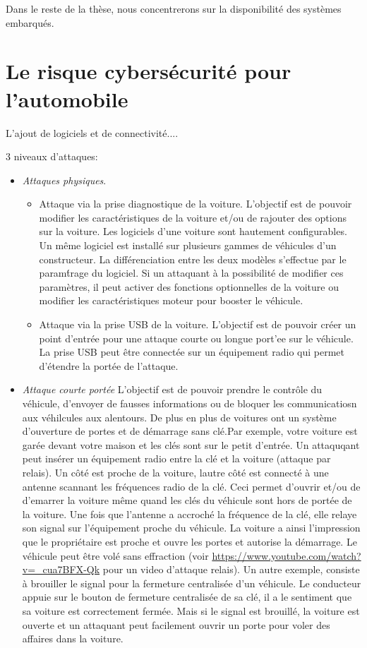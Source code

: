Dans le reste de la th\`ese, nous concentrerons sur la disponibilit\'e des syst\`emes embarqu\'es. 


\section {Le risque cybers\'ecurit\'e pour l'automobile}
 \medskip
 {\Huge L}'ajout de logiciels et de connectivit\'e....


3 niveaux d'attaques:
\begin{itemize}
\setlength\itemsep{1em}
\item \emph{Attaques physiques}. 
\begin{itemize}
\item Attaque via la prise diagnostique de la voiture. L'objectif est de pouvoir modifier les caract\'eristiques de la voiture et/ou de rajouter des options sur la voiture. Les logiciels d'une voiture sont hautement configurables. Un m\^eme logiciel est install\'e sur plusieurs gammes de v\'ehicules d'un constructeur. La diff\'erenciation entre les deux mod\`eles s'effectue par le param\'trage du logiciel. Si un attaquant \`a la possibilit\'e de modifier ces param\`etres, il peut activer des fonctions optionnelles de la voiture ou modifier les caract\'eristiques moteur pour booster le v\'ehicule.
\item Attaque via la prise USB de la voiture. L'objectif est de pouvoir cr\'eer un point d'entr\'ee pour une attaque courte ou longue port'ee sur le v\'ehicule. La prise USB peut \^etre connect\'ee sur un \'equipement radio qui permet d'\'etendre la port\'ee de l'attaque.
\end{itemize}

\item \emph{Attaque courte port\'ee} L'objectif est de pouvoir prendre le contr\^ole du v\'ehicule, d'envoyer de fausses informations ou de bloquer les communicatiosn aux v\'ehilcules aux alentours. De plus en plus de voitures ont un syst\`eme d'ouverture de portes et de d\'emarrage sans cl\'e.Par exemple, votre voiture est gar\'ee devant votre maison et les cl\'es sont sur le petit d'entr\'ee.  Un attaquqant peut ins\'erer un \'equipement radio entre la cl\'e et la voiture (attaque par relais). Un c\^ot\'e est proche de la voiture, lautre c\^ot\'e est connect\'e \`a une antenne scannant les fr\'equences radio de la cl\'e. Ceci permet d'ouvrir et/ou de d'emarrer la voiture m\^eme quand les cl\'es du v\'ehicule sont hors de port\'ee de la voiture. Une fois que l'antenne a accroch\'e la fr\'equence de la cl\'e, elle relaye son signal sur l'\'equipement proche du v\'ehicule. La voiture a ainsi l'impression que le propri\'etaire est proche et ouvre les portes et autorise la d\'emarrage. Le v\'ehicule peut \^etre vol\'e sans effraction (voir \url{https://www.youtube.com/watch?v=_cua7BFX-Qk} pour un video d'attaque relais). Un autre exemple, consiste \`a brouiller le signal pour la fermeture centralis\'ee d'un v\'ehicule. Le conducteur appuie sur le bouton de fermeture centralis\'ee de sa cl\'e, il a le sentiment que sa voiture est correctement ferm\'ee. Mais si le signal est brouill\'e, la voiture est ouverte et un attaquant peut facilement ouvrir un porte pour voler des affaires dans la voiture.
 

\end{itemize}
